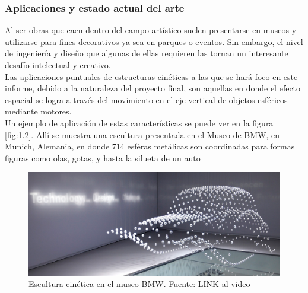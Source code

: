 \newpage
\subsubsection{Aplicaciones y estado actual del arte}
Al ser obras que caen dentro del campo artístico suelen presentarse en museos y utilizarse para fines decorativos ya sea en parques o eventos. Sin embargo, el nivel de ingeniería y diseño que algunas de ellas requieren las tornan un interesante desafío intelectual y creativo.\\


Las aplicaciones puntuales de estructuras cinéticas a las que se hará foco en este informe, debido a la naturaleza del proyecto final, son aquellas en donde el efecto espacial se logra a través del movimiento en el eje vertical de objetos esféricos mediante motores. \\

Un ejemplo de aplicación de estas características se puede ver en la figura \ref{fig:1.2}. Allí se muestra una escultura presentada en el Museo de BMW, en Munich, Alemania, en donde 714 esféras metálicas son coordinadas para formas figuras como olas, gotas, y hasta la silueta de un auto \\
\begin{figure}[!ht]
	\centering
	\includegraphics[width=15cm,scale=1]{resources/1_2-kinSculp.png}
	\caption{ Escultura cinética en el museo BMW. Fuente: \href{https://www.youtube.com/watch?v=HVhVClFMg6Y}{LINK al video} }
	\label{fig:\thefigure}
\end{figure}

